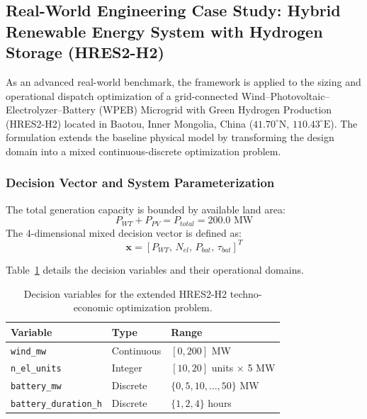 \subsection{Real-World Engineering Case Study: Hybrid Renewable Energy System with Hydrogen Storage (HRES2-H2)}
\label{sec:hres2_case_study}

As an advanced real-world benchmark, the framework is applied to the sizing and operational dispatch optimization of a grid-connected Wind--Photovoltaic--Electrolyzer--Battery (WPEB) Microgrid with Green Hydrogen Production (HRES2-H2) located in Baotou, Inner Mongolia, China ($41.70^\circ\text{N}$, $110.43^\circ\text{E}$). The formulation extends the baseline physical model \cite{li2024capacity} by transforming the design domain into a mixed continuous-discrete optimization problem.

\subsubsection{Decision Vector and System Parameterization}

The total generation capacity is bounded by available land area:
\begin{equation}
P_{WT} + P_{PV} = P_{total} = 200.0 \text{ MW}
\label{eq:generation_constraint}
\end{equation}
The 4-dimensional mixed decision vector is defined as:
\begin{equation}
\mathbf{x} = \left[ P_{WT},\, N_{el},\, P_{bat},\, \tau_{bat} \right]^T
\label{eq:hres2_decision_vector}
\end{equation}

Table~\ref{tab:hres2_decision_vars} details the decision variables and their operational domains.

\begin{table}[htbp]
\centering
\caption{Decision variables for the extended HRES2-H2 techno-economic optimization problem.}
\label{tab:hres2_decision_vars}
\vspace{2mm}
\begin{tabular}{lll}
\toprule
\textbf{Variable} & \textbf{Type} & \textbf{Range} \\
\midrule
\texttt{wind\_mw} & Continuous & $[0, 200]$ MW \\
\texttt{n\_el\_units} & Integer & $[10, 20]$ units $\times$ 5 MW \\
\texttt{battery\_mw} & Discrete & $\{0, 5, 10, \dots, 50\}$ MW \\
\texttt{battery\_duration\_h} & Discrete & $\{1, 2, 4\}$ hours \\
\bottomrule
\end{tabular}
\end{table}

